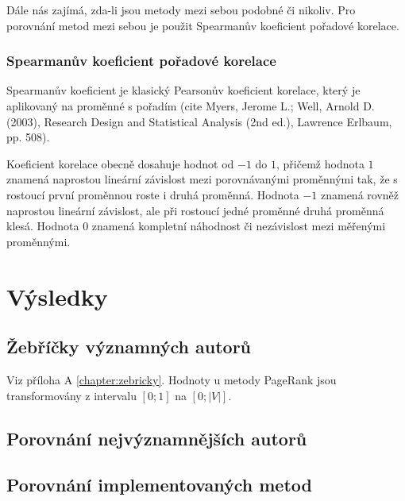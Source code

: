 \documentclass[12pt,titlepage]{report}
\begin{document}
Dále nás zajímá, zda-li jsou metody mezi sebou podobné či nikoliv. Pro
porovnání metod mezi sebou je použit Spearmanův koeficient pořadové korelace.

\subsection{Spearmanův koeficient pořadové korelace}
Spearmanův koeficient je klasický Pearsonův koeficient korelace, který je
aplikovaný na proměnné s pořadím (cite Myers, Jerome L.; Well, Arnold D.
(2003), Research Design and Statistical Analysis (2nd ed.), Lawrence Erlbaum,
pp. 508).

Koeficient korelace obecně dosahuje hodnot od $-1$ do $1$, přičemž hodnota $1$
znamená naprostou lineární závislost mezi porovnávanými proměnnými tak, že s
rostoucí první proměnnou roste i druhá proměnná. Hodnota $-1$ znamená rovněž
naprostou lineární závislost, ale při rostoucí jedné proměnné druhá proměnná
klesá. Hodnota $0$ znamená kompletní náhodnost či nezávislost mezi měřenými
proměnnými.








\chapter{Výsledky}
\section{Žebříčky významných autorů}
Viz příloha A \ref{chapter:zebricky}. Hodnoty u metody PageRank jsou
transformovány z intervalu $[0; 1]$ na $[0; |V|]$.
\section{Porovnání nejvýznamnějších autorů}
\section{Porovnání implementovaných metod}
\end{document}
